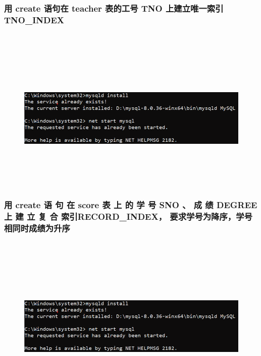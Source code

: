 \documentclass{ctexart}
\begin{document}
\subsubsection{用 create 语句在 teacher 表的工号 TNO 上建立唯一索引 TNO\_INDEX}
\begin{lstlisting}[language=sql]
	
\end{lstlisting}
\begin{figure}[H]
	\centering 
	\includegraphics[height=7cm,width=14cm]{1.png}
	\end{figure}
\subsubsection{用 create 语 句 在 score 表 上 的 学 号 SNO 、 成 绩 DEGREE 上 建 立 复 合 索引RECORD\_INDEX， 要求学号为降序，学号相同时成绩为升序}
\begin{lstlisting}[language=sql]
	
\end{lstlisting}
\begin{figure}[H]
	\centering 
	\includegraphics[height=7cm,width=14cm]{1.png}
	\end{figure}
\end{document}
